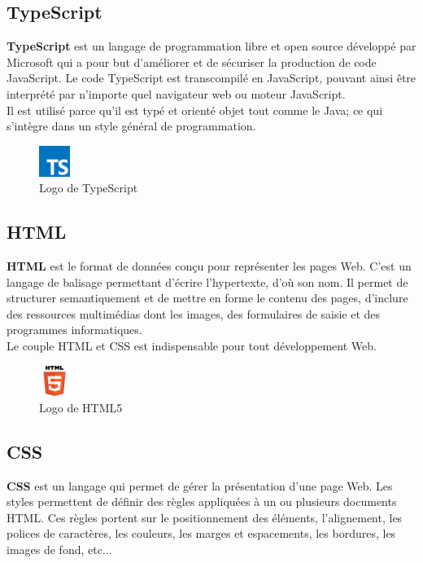 \documentclass[12pt]{report}
\begin{document}
	  \subsection{TypeScript}
	    \textbf{TypeScript} est un langage de programmation libre et open source développé par Microsoft qui a pour but d'améliorer et de sécuriser la production de code JavaScript. Le code TypeScript est transcompilé en JavaScript, pouvant ainsi être interprété par n'importe quel navigateur web ou moteur JavaScript.\cite{typeScript}
	    \\Il est utilisé parce qu'il est typé et orienté objet tout comme le Java; ce qui s'intègre dans un style général de programmation.
	    
	     \begin{figure}[H]
	      \begin{center}
		\includegraphics[scale=0.2, width=1cm]{images/logoTypeScript.png}
		\caption{Logo de TypeScript}
	      \end{center}
	    \end{figure}
	    
	    \subsection{HTML}
	      \textbf{\gls{HTML}} est le format de données conçu pour représenter les pages Web. C'est un langage de balisage permettant d'écrire l'hypertexte, d'où son nom. Il permet de structurer semantiquement et de mettre en forme le contenu des pages, d'inclure des ressources multimédias dont les images, des formulaires de saisie et des programmes informatiques.
	      \\Le couple \gls{HTML} et \gls{CSS} est indispensable pour tout développement Web.\cite{html}
	      
	      \begin{figure}[H]
		\begin{center}
		  \includegraphics[scale=0.3, width=1cm]{images/logoHtml.png}
		  \caption{Logo de HTML5}
		\end{center}
	      \end{figure}


	  \subsection{CSS}
	    \textbf{\gls{CSS}} est un langage qui permet de gérer la présentation d'une page Web. Les styles permettent de définir des règles appliquées à un ou plusieurs documents \gls{HTML}. Ces règles portent sur le positionnement des éléments, l'alignement, les polices de caractères, les couleurs, les marges et espacements, les bordures, les images de fond, etc...\cite{css}
	    
\end{document}
